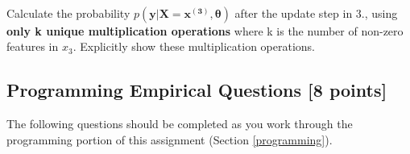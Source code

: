\documentclass[11pt]{exam}
\numberwithin{equation}{section} %
\numberwithin{figure}{section} %
\numberwithin{table}{section} %
\def\y{\mathbf y}
\newcommand{\thetav     }{\boldsymbol \theta     }
\begin{document}
\begin{questions}
\begin{table}[h]
\begin{tabular}{cll}
    \bottomrule
    \end{tabular}
    \end{table}\\
    Calculate the probability $p\left(\y|\mathbf{X=x^{(3)}},\thetav\right)$ after the update step in 3., using \textbf{only k unique multiplication operations} where k is the number of non-zero features in $x_3$. Explicitly show these multiplication operations.

    
    \begin{your_solution}
    \bigskip \bigskip \bigskip \bigskip \bigskip \bigskip \bigskip \bigskip
    \bigskip \bigskip \bigskip \bigskip \bigskip \bigskip \bigskip \bigskip
  
    \end{your_solution}
    

 \end{questions}
 \clearpage
\subsection{Programming Empirical Questions [8 points]}
\label{sec:empirical}

The following questions should be completed as you work through the programming portion of this assignment (Section \ref{programming}).
\end{document}
